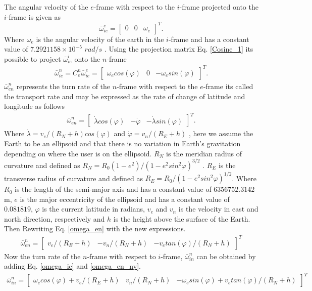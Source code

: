 The angular velocity of the $e$-frame with respect to the $i$-frame projected onto the $i$-frame is given as \cite{nonlinear}
\begin{equation}
\bar{\omega}_{ie}^e = 
\begin{bmatrix}
0 & 0 & \omega_e
\end{bmatrix}^T.
\end{equation}
Where $\omega_e$ is the angular velocity of the earth in the $i$-frame and has a constant value of
$7.2921158 \times 10^{-5}$ $rad/s$ \cite{nonlinear}. Using the projection matrix Eq. \eqref{Cosine_1} its possible to project $\bar{\omega}_ {ie}^i$ onto the $n$-frame
\begin{align}
\bar{\omega}_{ie}^n=C_e^n\bar{\omega}_{ie}^e=
\begin{bmatrix}
\omega_e cos(\varphi) & 0 & -\omega_e sin(\varphi)
\end{bmatrix}^T.
\label{omega_ie}
\end{align}
$\bar{\omega}_{en}^n$ represents the turn rate of the $n$-frame with respect to the $e$-frame its called the transport rate and may be expressed as the rate of change of latitude and longitude as follows
\begin{align}
\bar{\omega}_{en}^n=
\begin{bmatrix}
\dot{\lambda}cos(\varphi) & -\dot{\varphi} & -\dot{\lambda}sin(\varphi)
\end{bmatrix}^T.
\label{omega_en}
\end{align}
Where $\dot{\lambda}=v_e/(R_N+h)cos(\varphi)$ and $\dot{\varphi}=v_n/(R_E+h)$ \cite{nonlinear}, here we assume the Earth to be an ellipsoid and that there is no variation in Earth's gravitation depending on where the user is on the ellipsoid. $R_N$ is the meridian radius of curvature and defined as $R_N=R_0(1-e^2)/(1-e^2sin^2\varphi)^{3/2}$ \cite{nonlinear}. $R_E$ is the transverse radius of curvature and defined as $R_E=R_0/(1-e^2sin^2\varphi)^{1/2}$. Where $R_0$ is the length of the semi-major axis and has a constant value of $6356752.3142$ m, $e$ is the major eccentricity of the ellipsoid and has a constant value of $0.081819$, $\varphi$ is the current latitude in radians, $v_e$ and $v_n$ is the velocity in east and north direction, respectively and $h$ is the height above the surface of the Earth. Then Rewriting Eq. \eqref{omega_en} with the new expressions.
\begin{align}
\bar{\omega}_{en}^n=
\begin{bmatrix}
v_e/(R_E+h) & -v_n/(R_N+h) & -v_e tan(\varphi)/(R_N+h)
\end{bmatrix}^T \label{omega_en_ny}
\end{align}
Now the turn rate of the $n$-frame with respect to $i$-frame, $\bar{\omega}_{in}^n$ can be obtained by adding Eq. \eqref{omega_ie} and \eqref{omega_en_ny}.
\begin{align}
\bar{\omega}_{in}^n=
\begin{bmatrix}
\omega_e cos(\varphi) + v_e/(R_E+h) & v_n/(R_N+h) & -\omega_e sin(\varphi) + v_e tan(\varphi)/(R_N+h)
\end{bmatrix}^T
\label{Eq.omega_in}
\end{align}


